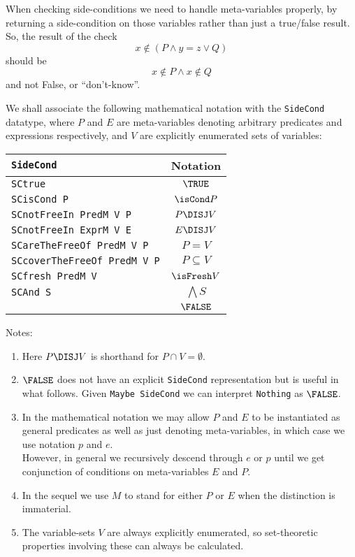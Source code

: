 When checking side-conditions we need to handle meta-variables properly, by returning a side-condition on those variables rather than just a true/false result. So, the result of the check
$$
  x \not\in  ( P \land y=z \lor Q )
$$
should be
$$
  x \not\in P \land x \notin Q
$$
and not False, or ``don't-know''.

We shall associate the following mathematical notation
with the \texttt{SideCond} datatype,
where $P$ and $E$ are meta-variables denoting arbitrary predicates and
expressions respectively,
and $V$ are explicitly enumerated sets of variables:

\begin{tabular}{|l|c|}
  \hline
  \texttt{SideCond} & Notation
\\\hline
  \texttt{SCtrue}  & $\TRUE$
\\\hline
  \texttt{SCisCond P}  & $\isCond P$
\\\hline
  \texttt{SCnotFreeIn PredM V P}  & $P \DISJ V$
\\\hline
  \texttt{SCnotFreeIn ExprM V E}  & $E \DISJ V$
\\\hline
  \texttt{SCareTheFreeOf PredM V P}  & $P = V$
\\\hline
  \texttt{SCcoverTheFreeOf PredM V P}  & $ P \subseteq V $
\\\hline
  \texttt{SCfresh PredM V}  & $\isFresh V$
\\\hline
  \texttt{SCAnd S}  & $\bigwedge S$
\\\hline & $ \FALSE  $
\\\hline
\end{tabular}

Notes:
\begin{enumerate}
  \item Here $P \DISJ V$ is shorthand for $P \cap V = \emptyset$.
  \item $\FALSE$ does not have an explicit \texttt{SideCond} representation
   but is useful in what follows.
   Given \texttt{Maybe SideCond} we can interpret \texttt{Nothing} as $\FALSE$.
  \item
    In the mathematical notation we may allow $P$ and $E$ to be instantiated
    as general predicates as well as just denoting meta-variables,
    in which case we use notation $p$ and $e$.
    \\However, in general we recursively descend through $e$ or $p$
    until we get conjunction of conditions on meta-variables $E$ and $P$.
  \item In the sequel we use $M$ to stand for either $P$ or $E$ when the distinction
    is immaterial.
  \item
    The variable-sets $V$ are always explicitly enumerated,
    so set-theoretic properties involving these can always be calculated.
\end{enumerate}

